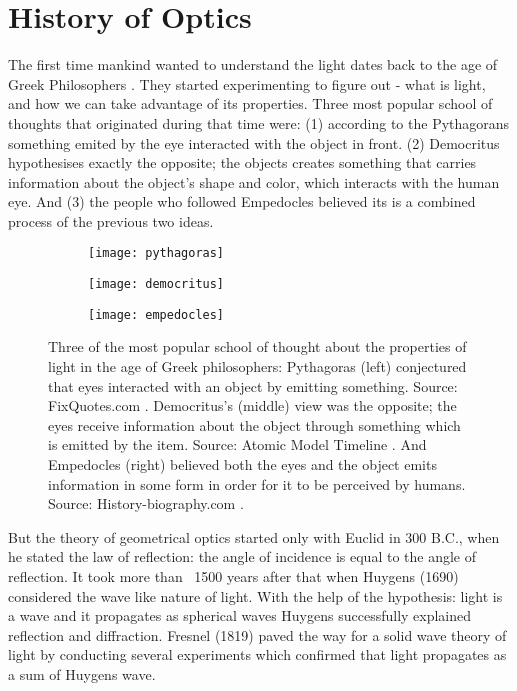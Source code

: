 \section{History of Optics}
The first time mankind wanted to understand the light dates back to the age of Greek Philosophers \cite{Vohnsen_2004}. They started experimenting to figure out - what is light, and how we can take advantage of its properties. Three most popular school of thoughts that originated during that time were: (1) according to the Pythagorans something emited by the eye interacted with the object in front. (2) Democritus hypothesises exactly the opposite; the objects creates something that carries information about the object's shape and color, which interacts with the human eye. And (3) the people who followed Empedocles believed its is a combined process of the previous two ideas. 
\begin{figure}
\begin{subfigure}{.3\textwidth}
  \centering
  \texttt{[image: pythagoras]}
  \label{fig:pythagoras}
\end{subfigure}%
\begin{subfigure}{.3\textwidth}
  \centering
  \texttt{[image: democritus]}
  \label{fig:democritus}
\end{subfigure}
\begin{subfigure}{.3\textwidth}
  \centering
  \texttt{[image: empedocles]}
  \label{fig:empedocles}
\end{subfigure}%
\caption{Three of the most popular school of thought about the properties of light in the age of Greek philosophers: Pythagoras (left) conjectured that eyes interacted with an object by emitting something. Source: FixQuotes.com \cite{pythagoras_pic}. Democritus's (middle) view was the opposite; the eyes receive information about the object through something which is emitted by the item. Source: Atomic Model Timeline \cite{democritus_pic}. And Empedocles (right) believed both the eyes and the object emits information in some form in order for it to be perceived by humans. Source: History-biography.com \cite{empedocles_pic}.}
\label{fig:early_hypothesis}
\end{figure}
But the theory of geometrical optics started only with Euclid  in 300 B.C.\cite{Abetti1971}, when he stated the law of reflection: the angle of incidence is equal to the angle of reflection. It took more than ~1500 years after that when Huygens (1690) considered the wave like nature of light. With the help of the hypothesis: light is a wave and it propagates as spherical waves Huygens successfully explained reflection and diffraction. Fresnel (1819) paved the way for a solid wave theory of light by conducting several experiments which confirmed that light propagates as a sum of Huygens wave. 

